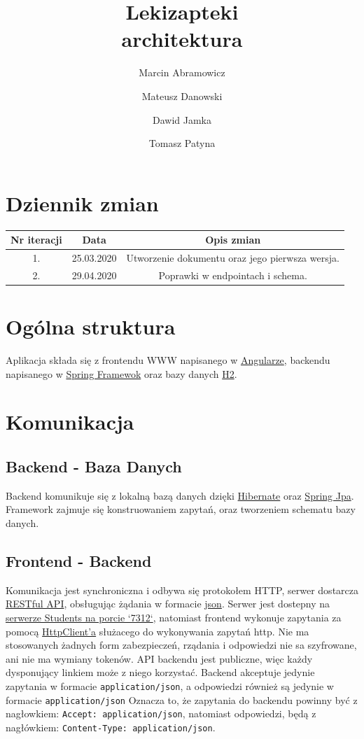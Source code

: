 \documentclass{article}
\title{
Lekizapteki\\
\large architektura}
\author{Marcin Abramowicz \and Mateusz Danowski \and Dawid Jamka \and Tomasz Patyna}
\begin{document}
  \maketitle

  \section{Dziennik zmian}
    \begin{tabular}{|c|c|c|}
      Nr iteracji & Data & Opis zmian \\
      \hline
      1. & 25.03.2020 & Utworzenie dokumentu oraz jego pierwsza wersja. \\
      \hline
      2. & 29.04.2020 & Poprawki w endpointach i schema. \\
    \end{tabular}

  \section{Ogólna struktura}
    Aplikacja składa się z frontendu WWW napisanego w
    \href{https://angular.io}{Angularze}, backendu napisanego w
    \href{https://spring.io}{Spring Framewok} oraz bazy danych
    \href {https://www.h2database.com/html/main.html}{H2}.

  \section{Komunikacja}
    \subsection{Backend - Baza Danych}
    Backend komunikuje się z lokalną bazą danych dzięki
    \href{https://hibernate.org}{Hibernate} oraz
    \href{https://spring.io/projects/spring-data-jpa} {Spring Jpa}.
    Framework zajmuje się konstruowaniem zapytań, oraz tworzeniem schematu bazy danych.

    \subsection{Frontend - Backend}
    Komunikacja jest synchroniczna i odbywa się protokołem HTTP, serwer dostarcza
    \href{https://en.wikipedia.org/wiki/Representational_state_transfer}{RESTful API},
    obsługując żądania w formacie
    \href{https://en.wikipedia.org/wiki/JSON}{json}.
    Serwer jest dostepny na
    \href{http://students.mimuw.edu.pl:7312}{serwerze Students na porcie `7312`},
    natomiast frontend wykonuje zapytania za pomocą
    \href{https://angular.io/guide/http}{HttpClient'a} służacego do wykonywania zapytań http.
    Nie ma stosowanych żadnych form zabezpieczeń, rządania i odpowiedzi nie sa szyfrowane, ani nie ma wymiany tokenów.
    API backendu jest publiczne, więc każdy dysponujący linkiem może z niego korzystać.
    Backend akceptuje jedynie zapytania w formacie \texttt{application/json},
    a odpowiedzi również są jedynie w formacie \texttt{application/json}
    Oznacza to, że zapytania do backendu powinny być z nagłowkiem: \texttt{Accept: application/json},
    natomiast odpowiedzi, będą z nagłówkiem: \texttt{Content-Type: application/json}.
\end{document}
